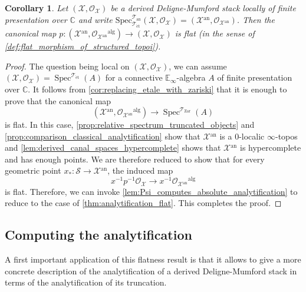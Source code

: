 \documentclass[12pt,a4paper,reqno]{amsart}
\theoremstyle{plain}
\newtheorem{cor}[thm]{Corollary}
\theoremstyle{definition}
\theoremstyle{remark}
\numberwithin{equation}{section}
\begin{document}
\begin{cor} \label{cor:analytification_flat}
	Let $({\mathcal X}, {\mathcal O}_{\mathcal X})$ be a derived {Deligne-Mumford\xspace} stack locally of finite presentation over $\mathbb C$ and write $\mathrm{Spec}^{{\mathcal T}_{\mathrm{an}}}_{{\mathcal T}_{\mathrm{\acute{e}t}}}({\mathcal X}, {\mathcal O}_{\mathcal X}) = ({\mathcal X}{^\mathrm{an}}, {\mathcal O}_{{\mathcal X}{^\mathrm{an}}})$.
	Then the canonical map $p \colon ({\mathcal X}{^\mathrm{an}}, {\mathcal O}_{{\mathcal X}{^\mathrm{an}}}{^\mathrm{alg}}) \to ({\mathcal X}, {\mathcal O}_{\mathcal X})$ is flat (in the sense of \cref{def:flat_morphism_of_structured_topoi}).
\end{cor}
	
\begin{proof}
	The question being local on $({\mathcal X}, {\mathcal O}_{\mathcal X})$, we can assume $({\mathcal X}, {\mathcal O}_{\mathcal X}) = \operatorname{Spec}^{{\mathcal T}_{\mathrm{\acute{e}t}}}(A)$ for a connective $\mathbb E_\infty$-algebra $A$ of finite presentation over $\mathbb C$.
	It follows from \cref{cor:replacing_etale_with_zariski} that it is enough to prove that the canonical map
	\[ ({\mathcal X}{^\mathrm{an}}, {\mathcal O}_{{\mathcal X}{^\mathrm{an}}}{^\mathrm{alg}}) \to \operatorname{Spec}^{{\mathcal T}_{\mathrm{Zar}}}(A) \]
	is flat. In this case, \cref{prop:relative_spectrum_truncated_objects} and \cref{prop:comparison_classical_analytification} show that ${\mathcal X}{^\mathrm{an}}$ is a $0$-localic $\infty$-topos and \cref{lem:derived_canal_spaces_hypercomplete} shows that ${\mathcal X}{^\mathrm{an}}$ is hypercomplete and has enough points.
	We are therefore reduced to show that for every geometric point $x_* \colon {\mathcal S} \to {\mathcal X}{^\mathrm{an}}$, the induced map
	\[ x{^{-1}} p{^{-1}} {\mathcal O}_{\mathcal X} \to x{^{-1}} {\mathcal O}_{{\mathcal X}{^\mathrm{an}}}{^\mathrm{alg}} \]
	is flat.
	Therefore, we can invoke \cref{lem:Psi_computes_absolute_analytification} to reduce to the case of \cref{thm:analytification_flat}.
	This completes the proof.
\end{proof}
	
\subsection{Computing the analytification} \label{subsec:computing_analytification}
	
A first important application of this flatness result is that it allows to give a more concrete description of the analytification of a derived {Deligne-Mumford\xspace} stack in terms of the analytification of its truncation.
	
\end{document}
